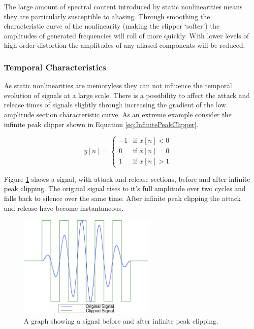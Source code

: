 			The large amount of spectral content introduced by static nonlinearities means they are
			particularly susceptible to aliasing. Through smoothing the characteristic curve of the
			nonlinearity (making the clipper `softer') the amplitudes of generated frequencies will roll of
			more quickly. With lower levels of high order distortion the amplitudes of any aliased components
			will be reduced.

		\subsubsection*{Temporal Characteristics}
			As static nonlinearities are memoryless they can not influence the temporal evolution of signals at
			a large scale. There is a possibility to affect the attack and release times of signals slightly
			through increasing the gradient of the low amplitude section characteristic curve. As an extreme
			example consider the infinite peak clipper shown in Equation \ref{eq:InfinitePeakClipper}.

			\begin{equation}
				y[n] = \begin{cases}
					-1 & \text{if $x[n] < 0$} \\
					0 & \text{if $x[n] = 0$} \\
					1 & \text{if $x[n] > 1$}
				\end{cases}
				\label{eq:InfinitePeakClipper}
			\end{equation}
			
			Figure \ref{fig:InfinitePeakClipping} shows a signal, with attack and release sections, before and
			after infinite peak clipping. The original signal rises to it's full amplitude over two cycles and
			falls back to silence over the same time. After infinite peak clipping the attack and release have
			become instantaneous.

			\begin{figure}[h!]
				\centering
				\includegraphics[width=0.6\textwidth]{chapter3/Images/InfinitePeakClipping.eps}
				\caption{A graph showing a signal before and after infinite peak clipping.}
				\label{fig:InfinitePeakClipping}
			\end{figure}

